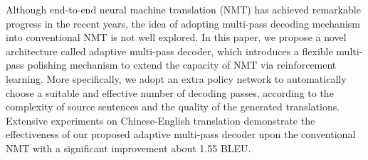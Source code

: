 Although end-to-end neural machine translation (NMT) has achieved remarkable progress in the recent years, the idea of adopting multi-pass decoding mechanism into conventional NMT is not well explored. In this paper, we propose a novel architecture called adaptive multi-pass decoder,  which introduces a flexible multi-pass polishing mechanism to extend the capacity of NMT via reinforcement learning. More specifically, we adopt an extra policy network to automatically choose a suitable and effective number of decoding passes, according to the complexity of source sentences and the quality of the generated translations. Extensive experiments on Chinese-English translation demonstrate the effectiveness of our proposed adaptive multi-pass decoder upon the conventional NMT with a significant improvement about 1.55 BLEU.
